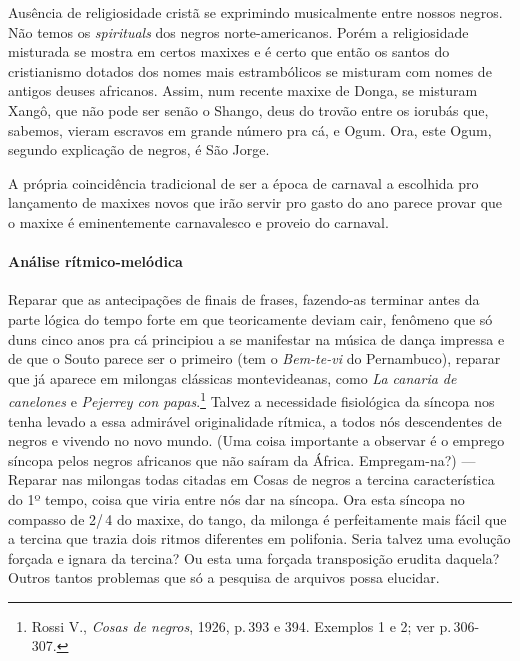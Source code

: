 Ausência de religiosidade cristã se exprimindo musicalmente entre nossos
negros. Não temos os \textit{spirituals} dos negros norte-americanos. Porém a
religiosidade misturada se mostra em certos maxixes e é certo que então
os santos do cristianismo dotados dos nomes mais estrambólicos se
misturam com nomes de antigos deuses africanos. Assim, num recente maxixe
de Donga, se misturam Xangô, que não pode ser senão o Shango, deus do
trovão entre os iorubás que, sabemos, vieram escravos em grande número pra
cá, e Ogum. Ora, este Ogum, segundo explicação de negros, é São Jorge. %

A própria coincidência tradicional de ser a época de carnaval a
escolhida pro lançamento de maxixes novos que irão servir pro gasto do
ano parece provar que o maxixe é eminentemente carnavalesco e proveio do
carnaval. %

\paragraph{Análise rítmico-melódica} Reparar que as antecipações de finais de frases, fazendo-as terminar
antes da parte lógica do tempo forte em que teoricamente deviam cair,
fenômeno que só duns cinco anos pra cá principiou a se manifestar na música
de dança impressa e de que o Souto parece ser o primeiro (tem o
\textit{Bem-te-vi} do Pernambuco), reparar que já aparece em milongas
clássicas montevideanas, como \textit{La canaria de canelones} e
\textit{Pejerrey con papas}.\footnote{Rossi V., \textit{Cosas de negros}, 1926,
p.\,393 e 394. Exemplos 1 e 2; ver p.\,306-307.} Talvez a necessidade
fisiológica da síncopa nos tenha levado a essa admirável originalidade
rítmica, a todos nós descendentes de negros e vivendo no novo mundo.
(Uma coisa importante a observar é o emprego síncopa pelos negros
africanos que não saíram da África. Empregam-na?) --- Reparar nas milongas
todas citadas em Cosas de negros a tercina característica do 1º tempo,
coisa que viria entre nós dar na síncopa. Ora esta síncopa no compasso
de 2/\,4 do maxixe, do tango, da milonga é perfeitamente mais fácil que a
tercina que trazia dois ritmos diferentes em polifonia. Seria talvez uma
evolução forçada e ignara da tercina? Ou esta uma forçada transposição
erudita daquela? Outros tantos problemas que só a pesquisa de arquivos
possa elucidar.

